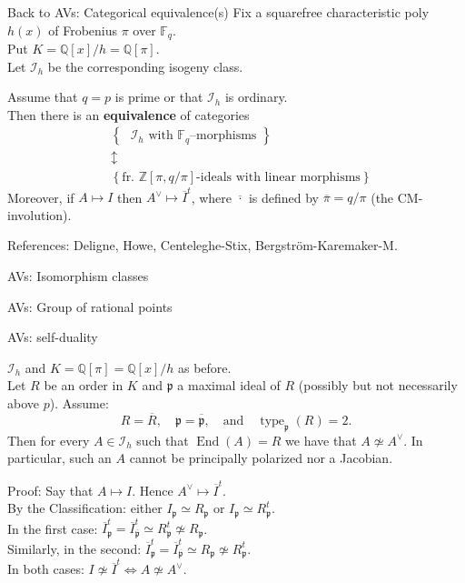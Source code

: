 \documentclass[usenames,dvipsnames,handout]{beamer}
\def\Q{\mathbb{Q}}
\def\Z{\mathbb{Z}}
\def\F{\mathbb{F}}
\DeclareMathOperator{\End}{End}
\DeclareMathOperator{\type}{type}
\newcommand{\p}{{\mathfrak p}}
\newcommand{\set}[1]{\left\lbrace#1\right\rbrace }
\begin{document}
\begin{frame}{ Back to AVs: Categorical equivalence(s) }
    Fix a squarefree characteristic poly $h(x)$ of Frobenius $\pi$ over $\F_q$.\\
    Put $K=\Q[x]/h=\Q[\pi]$.\\
    Let $\mathcal{I}_h$ be the corresponding isogeny class.
    \pause 
    \begin{theorem}
        Assume that $q=p$ is prime or that $\mathcal{I}_h$ is ordinary.\\
        \pause Then there is an {\bf equivalence} of categories
        \[
        \begin{array}{cc}
        & \set{ \text{ $\mathcal{I}_h$ with $\F_q$--morphisms } }  \\
        & \updownarrow \\ 
        & \set{ \text{fr.~$\Z[\pi,q/\pi]$-ideals with linear morphisms} }
        \end{array} 
        \]  
        \pause Moreover, if $A\mapsto I$ then $A^\vee \mapsto \overline{I}^t$, where $\overline{\cdot}$ is defined by $\overline{\pi}=q/\pi$ (the CM-involution).
    \end{theorem}
    \pause References: Deligne, Howe, Centeleghe-Stix, Bergstr\"om-Karemaker-M.
\end{frame}

\begin{frame}{ AVs: Isomorphism classes }

\end{frame}

\begin{frame}{ AVs: Group of rational points }

\end{frame}

\begin{frame}{ AVs: self-duality }
    \begin{theorem}[ Springer-M. ]
        $\mathcal{I}_h$ and $K=\Q[\pi]=\Q[x]/h$ as before.\\
        \pause Let $R$ be an order in $K$ and $\p$ a maximal ideal of $R$ (possibly but not necessarily above $p$). 
        \pause Assume:
        \[ R=\overline{R}, \quad \p = \overline{\p},\quad \text{and}\quad \type_\p(R) = 2 .\]
        \pause Then for every $A \in \mathcal{I}_h$ such that $\End(A)=R$ we have that $A\not\simeq A^\vee$. 
        \pause In particular, such an $A$ cannot be principally polarized nor a Jacobian.
    \end{theorem}
    \pause Proof: Say that $A \mapsto I$. Hence $A^\vee \mapsto \overline{I}^t$.\\
    \pause By the Classification: either $I_\p\simeq R_\p$ or $I_\p\simeq R_\p^t$.\\
    \pause In the first case: $\overline{I}_\p^t = \overline{I}_{\overline{\p}}^t \simeq R^t_\p \not\simeq R_\p$.\\
    \pause Similarly, in the second: $\overline{I}_\p^t = \overline{I}_{\overline{\p}}^t \simeq R_\p \not\simeq R_\p^t$.\\
    \pause In both cases: $I\not\simeq \overline{I}^t \iff A\not \simeq A^\vee$.
\end{frame}
\end{document}
